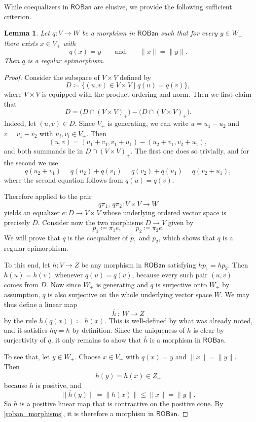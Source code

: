 \documentclass[11pt,onecolumn]{article}
\newcommand{\ROBan}{\mathsf{ROBan}}
\theoremstyle{plain}
\newtheorem{lem}[lem]{Lemma}
\theoremstyle{remark}
\theoremstyle{definition}
\begin{document}
While coequalizers in $\ROBan$ are elusive, we provide the following sufficient criterion.

\begin{lem}
	\label{lem:roban_special_coequalizer}
	Let $q \colon V \to W$ be a morphism in $\ROBan$ such that for every $y \in W_+$ there exists $x \in V_+$ with
	\[
		q(x)=y
		\qquad\text{and}\qquad
		\|x\|=\|y\|.
	\]
	Then $q$ is a regular epimorphism.
\end{lem}

\begin{proof}
	Consider the subspace of $V \times V$ defined by
	\[
		D \coloneqq \{(u,v) \in V \times V \mid q(u)=q(v)\},
	\]
	where $V \times V$ is equipped with the product ordering and norm.
	Then we first claim that
	\[
		D = \bigl(D \cap (V \times V)_+\bigr) - \bigl(D \cap (V \times V)_+\bigr).
	\]
	Indeed, let $(u,v) \in D$.
	Since $V_+$ is generating, we can write $u=u_1-u_2$ and $v=v_1-v_2$ with $u_i,v_i \in V_+$.
	Then
	\[
		(u,v)
		=
		(u_1+v_1,v_1+u_1) - (u_2+v_1,v_2+u_1),
	\]
	and both summands lie in $D \cap (V \times V)_+$.
	The first one does so trivially, and for the second we use
	\[
		q(u_2+v_1) = q(u_2)+q(v_1) = q(v_2)+q(u_1) = q(v_2+u_1),
	\]
	where the second equation follows from $q(u)=q(v)$.

	Therefore  applied to the pair
	\[
		q\pi_1,\, q\pi_2 \colon V \times V \to W
	\]
	yields an equalizer $e \colon D \to V \times V$ whose underlying ordered vector space is precisely $D$.
	Consider now the two morphisms $D \to V$ given by
	\[
		p_1 \coloneqq \pi_1 e,
		\qquad
		p_2 \coloneqq \pi_2 e.
	\]
	We will prove that $q$ is the coequalizer of $p_1$ and $p_2$, which shows that $q$ is a regular epimorphism.

	To this end, let $h \colon V \to Z$ be any morphism in $\ROBan$ satisfying $hp_1 = hp_2$.
	Then $h(u)=h(v)$ whenever $q(u)=q(v)$, because every such pair $(u,v)$ comes from $D$.
	Now since $W_+$ is generating and $q$ is surjective onto $W_+$ by assumption, $q$ is also surjective on the whole underlying vector space $W$.
	We may thus define a linear map
	\[
		\overline{h} \: : \: W \longrightarrow Z
	\]
	by the rule $\overline{h}(q(x)) \coloneqq h(x)$.
	This is well-defined by what was already noted, and it satisfies $\overline{h}q=h$ by definition.
	Since the uniqueness of $\overline{h}$ is clear by surjectivity of $q$, it only remains to show that $\overline{h}$ is a morphism in $\ROBan$.

	To see that, let $y \in W_+$.
	Choose $x \in V_+$ with $q(x)=y$ and $\|x\|=\|y\|$.
	Then
	\[
		\overline{h}(y)=h(x) \in Z_+
	\]
	because $h$ is positive, and
	\[
		\|\overline{h}(y)\| = \|h(x)\| \le \|x\| = \|y\|.
	\]
	So $\overline{h}$ is a positive linear map that is contractive on the positive cone.
	By \ref{roban_morphisms}, it is therefore a morphism in $\ROBan$.
\end{proof}
\end{document}
